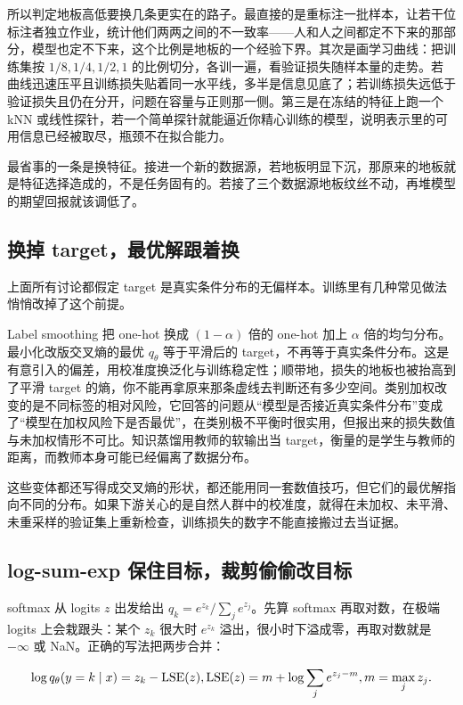 所以判定地板高低要换几条更实在的路子。最直接的是重标注一批样本，让若干位标注者独立作业，统计他们两两之间的不一致率——人和人之间都定不下来的那部分，模型也定不下来，这个比例是地板的一个经验下界。其次是画学习曲线：把训练集按 \(1/8,1/4,1/2,1\) 的比例切分，各训一遍，看验证损失随样本量的走势。若曲线迅速压平且训练损失贴着同一水平线，多半是信息见底了；若训练损失远低于验证损失且仍在分开，问题在容量与正则那一侧。第三是在冻结的特征上跑一个 kNN 或线性探针，若一个简单探针就能逼近你精心训练的模型，说明表示里的可用信息已经被取尽，瓶颈不在拟合能力。

最省事的一条是换特征。接进一个新的数据源，若地板明显下沉，那原来的地板就是特征选择造成的，不是任务固有的。若接了三个数据源地板纹丝不动，再堆模型的期望回报就该调低了。

\subsection{换掉 target，最优解跟着换}

上面所有讨论都假定 target 是真实条件分布的无偏样本。训练里有几种常见做法悄悄改掉了这个前提。

Label smoothing 把 one-hot 换成 \((1-\alpha)\) 倍的 one-hot 加上 \(\alpha\) 倍的均匀分布。最小化改版交叉熵的最优 \(q_\theta\) 等于平滑后的 target，不再等于真实条件分布。这是有意引入的偏差，用校准度换泛化与训练稳定性；顺带地，损失的地板也被抬高到了平滑 target 的熵，你不能再拿原来那条虚线去判断还有多少空间。类别加权改变的是不同标签的相对风险，它回答的问题从``模型是否接近真实条件分布''变成了``模型在加权风险下是否最优''，在类别极不平衡时很实用，但报出来的损失数值与未加权情形不可比。知识蒸馏用教师的软输出当 target，衡量的是学生与教师的距离，而教师本身可能已经偏离了数据分布。

这些变体都还写得成交叉熵的形状，都还能用同一套数值技巧，但它们的最优解指向不同的分布。如果下游关心的是自然人群中的校准度，就得在未加权、未平滑、未重采样的验证集上重新检查，训练损失的数字不能直接搬过去当证据。

\subsection{log-sum-exp 保住目标，裁剪偷偷改目标}

softmax 从 logits \(z\) 出发给出 \(q_k=e^{z_k}/\sum_j e^{z_j}\)。先算 softmax 再取对数，在极端 logits 上会栽跟头：某个 \(z_k\) 很大时 \(e^{z_k}\) 溢出，很小时下溢成零，再取对数就是 \(-\infty\) 或 NaN。正确的写法把两步合并：

\[
\log q_\theta(y=k\mid x)=z_k-\operatorname{LSE}(z),
\space
\operatorname{LSE}(z)=m+\log\sum_j e^{z_j-m},\space m=\max_j z_j.
\]


